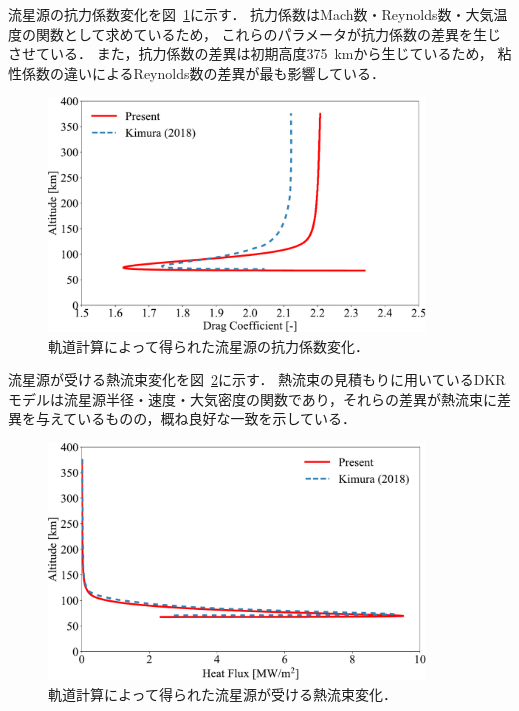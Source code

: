 流星源の抗力係数変化を図~\ref{fig:trajectory-Cd}に示す．
抗力係数はMach数・Reynolds数・大気温度の関数として求めているため，
これらのパラメータが抗力係数の差異を生じさせている．
また，抗力係数の差異は初期高度375~kmから生じているため，
粘性係数の違いによるReynolds数の差異が最も影響している．
\begin{figure}[p]
    \centering
    \includegraphics[width=10cm]{fig/trajectory/Cd.pdf}
    \caption{軌道計算によって得られた流星源の抗力係数変化．}
    \label{fig:trajectory-Cd}
\end{figure}

流星源が受ける熱流束変化を図~\ref{fig:trajectory-heat}に示す．
熱流束の見積もりに用いているDKRモデルは流星源半径・速度・大気密度の関数であり，それらの差異が熱流束に差異を与えているものの，概ね良好な一致を示している．
\begin{figure}[p]
    \centering
    \includegraphics[width=10cm]{fig/trajectory/heat.pdf}
    \caption{軌道計算によって得られた流星源が受ける熱流束変化．}
    \label{fig:trajectory-heat}
\end{figure}

